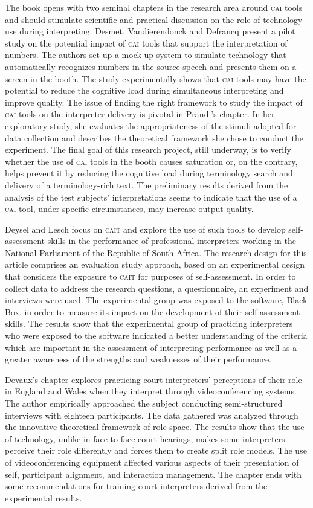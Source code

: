 \documentclass[output=paper]{langsci/langscibook}
\begin{document}
The book opens with two seminal chapters in the research area around \textsc{cai} tools and should stimulate scientific and practical discussion on the role of technology use during interpreting. Desmet, Vandierendonck and Defrancq present a pilot study on the potential impact of \textsc{cai} tools that support the interpretation of numbers. The authors set up a mock-up system to simulate technology that automatically recognizes numbers in the source speech and presents them on a screen in the booth. The study experimentally shows that \textsc{cai} tools may have the potential to reduce the cognitive load during simultaneous interpreting and improve quality. The issue of finding the right framework to study the impact of \textsc{cai} tools on the interpreter delivery is pivotal in Prandi’s chapter. In her exploratory study, she evaluates the appropriateness of the stimuli adopted for data collection and describes the theoretical framework she chose to conduct the experiment. The final goal of this research project, still underway, is to verify whether the use of \textsc{cai} tools in the booth causes saturation or, on the contrary, helps prevent it by reducing the cognitive load during terminology search and delivery of a terminology-rich text. The preliminary results derived from the analysis of the test subjects’ interpretations seems to indicate that the use of a \textsc{cai} tool, under specific circumstances, may increase output quality. 
 
Deysel and Lesch focus on \textsc{cait} and explore the use of such tools to develop self-assessment skills in the performance of professional interpreters working in the National Parliament of the Republic of South Africa. The research design for this article comprises an evaluation study approach, based on an experimental design that considers the exposure to \textsc{cait} for purposes of self-assessment. In order to collect data to address the research questions, a questionnaire, an experiment and interviews were used. The experimental group was exposed to the software, Black Box, in order to measure its impact on the development of their self-assessment skills. The results show that the experimental group of practicing interpreters who were exposed to the software indicated a better understanding of the criteria which are important in the assessment of interpreting performance as well as a greater awareness of the strengths and weaknesses of their performance. 
 
Devaux’s chapter explores practicing court interpreters’ perceptions of their role in England and Wales when they interpret through videoconferencing systems. The author empirically approached the subject conducting semi-structured interviews with eighteen participants. The data gathered was analyzed through the innovative theoretical framework of role-space. The results show that the use of technology, unlike in face-to-face court hearings, makes some interpreters perceive their role differently and forces them to create split role models. The use of videoconferencing equipment affected various aspects of their presentation of self, participant alignment, and interaction management. The chapter ends with some recommendations for training court interpreters derived from the experimental results. 
 
\end{document}
